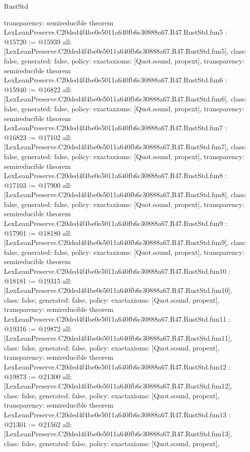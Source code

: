 \begin{lexlean}{RustStd}
\begin{coremodule}
{  transparency: semireducible
}
theorem LexLeanPreserve.C20ded4f4be0e5011a640fb6c30888a67.R47.RustStd.fun5 : @15720 := @15939 {
  all: [LexLeanPreserve.C20ded4f4be0e5011a640fb6c30888a67.R47.RustStd.fun5],
  class: false,
  generated: false,
  policy: exact{axioms: [Quot.sound, propext]},
  transparency: semireducible
}
theorem LexLeanPreserve.C20ded4f4be0e5011a640fb6c30888a67.R47.RustStd.fun6 : @15940 := @16822 {
  all: [LexLeanPreserve.C20ded4f4be0e5011a640fb6c30888a67.R47.RustStd.fun6],
  class: false,
  generated: false,
  policy: exact{axioms: [Quot.sound, propext]},
  transparency: semireducible
}
theorem LexLeanPreserve.C20ded4f4be0e5011a640fb6c30888a67.R47.RustStd.fun7 : @16823 := @17102 {
  all: [LexLeanPreserve.C20ded4f4be0e5011a640fb6c30888a67.R47.RustStd.fun7],
  class: false,
  generated: false,
  policy: exact{axioms: [Quot.sound, propext]},
  transparency: semireducible
}
theorem LexLeanPreserve.C20ded4f4be0e5011a640fb6c30888a67.R47.RustStd.fun8 : @17103 := @17900 {
  all: [LexLeanPreserve.C20ded4f4be0e5011a640fb6c30888a67.R47.RustStd.fun8],
  class: false,
  generated: false,
  policy: exact{axioms: [Quot.sound, propext]},
  transparency: semireducible
}
theorem LexLeanPreserve.C20ded4f4be0e5011a640fb6c30888a67.R47.RustStd.fun9 : @17901 := @18180 {
  all: [LexLeanPreserve.C20ded4f4be0e5011a640fb6c30888a67.R47.RustStd.fun9],
  class: false,
  generated: false,
  policy: exact{axioms: [Quot.sound, propext]},
  transparency: semireducible
}
theorem LexLeanPreserve.C20ded4f4be0e5011a640fb6c30888a67.R47.RustStd.fun10 : @18181 := @19315 {
  all: [LexLeanPreserve.C20ded4f4be0e5011a640fb6c30888a67.R47.RustStd.fun10],
  class: false,
  generated: false,
  policy: exact{axioms: [Quot.sound, propext]},
  transparency: semireducible
}
theorem LexLeanPreserve.C20ded4f4be0e5011a640fb6c30888a67.R47.RustStd.fun11 : @19316 := @19872 {
  all: [LexLeanPreserve.C20ded4f4be0e5011a640fb6c30888a67.R47.RustStd.fun11],
  class: false,
  generated: false,
  policy: exact{axioms: [Quot.sound, propext]},
  transparency: semireducible
}
theorem LexLeanPreserve.C20ded4f4be0e5011a640fb6c30888a67.R47.RustStd.fun12 : @19873 := @21300 {
  all: [LexLeanPreserve.C20ded4f4be0e5011a640fb6c30888a67.R47.RustStd.fun12],
  class: false,
  generated: false,
  policy: exact{axioms: [Quot.sound, propext]},
  transparency: semireducible
}
theorem LexLeanPreserve.C20ded4f4be0e5011a640fb6c30888a67.R47.RustStd.fun13 : @21301 := @21562 {
  all: [LexLeanPreserve.C20ded4f4be0e5011a640fb6c30888a67.R47.RustStd.fun13],
  class: false,
  generated: false,
  policy: exact{axioms: [Quot.sound, propext]},
}
\end{coremodule}
\end{lexlean}
